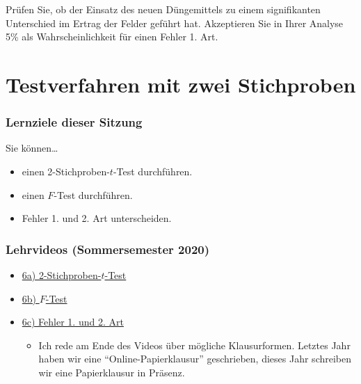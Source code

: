 \documentclass[
  11pt,
  ngerman,
  a4paper,
]{report}
\providecommand{\tightlist}{%
  \setlength{\itemsep}{0pt}\setlength{\parskip}{0pt}}
\begin{document}
Prüfen Sie, ob der Einsatz des neuen Düngemittels zu einem signifikanten Unterschied im Ertrag der Felder geführt hat. Akzeptieren Sie in Ihrer Analyse 5\% als Wahrscheinlichkeit für einen Fehler 1. Art.

\hypertarget{testverfahren-mit-zwei-stichproben}{%
\chapter{Testverfahren mit zwei Stichproben}\label{testverfahren-mit-zwei-stichproben}}

\hypertarget{lernziele-dieser-sitzung-5}{%
\subsection*{Lernziele dieser Sitzung}\label{lernziele-dieser-sitzung-5}}

Sie können\ldots{}

\begin{itemize}
\tightlist
\item
  einen 2-Stichproben-\(t\)-Test durchführen.
\item
  einen \(F\)-Test durchführen.
\item
  Fehler 1. und 2. Art unterscheiden.
\end{itemize}

\hypertarget{lehrvideos-sommersemester-2020-2}{%
\subsection*{Lehrvideos (Sommersemester 2020)}\label{lehrvideos-sommersemester-2020-2}}

\begin{itemize}
\tightlist
\item
  \href{https://video01.uni-frankfurt.de/Mediasite/Play/ef4a65b5bd3748f19f2d3b5cef41be6a1d}{6a) 2-Stichproben-\(t\)-Test}
\item
  \href{https://video01.uni-frankfurt.de/Mediasite/Play/cb5fc2416bcf4c4c8ebd7c645dbbaee21d}{6b) \(F\)-Test}
\item
  \href{https://video01.uni-frankfurt.de/Mediasite/Play/e437fdc1ee5147bb88cbf9b9d03262961d}{6c) Fehler 1. und 2. Art}

  \begin{itemize}
  \tightlist
  \item
    Ich rede am Ende des Videos über mögliche Klausurformen. Letztes Jahr haben wir eine \enquote{Online-Papierklausur} geschrieben, dieses Jahr schreiben wir eine Papierklausur in Präsenz.
  \end{itemize}
\end{itemize}
\end{document}
